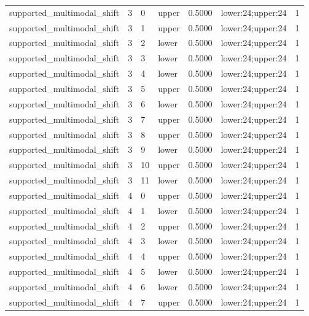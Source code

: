 \documentclass{article}
\begin{document}
\begin{table}[tbp]
{\begin{tabular}{lllllll}
supported\_multimodal\_shift & 3 & 0 & upper & 0.5000 & lower:24;upper:24 & 1 \\
supported\_multimodal\_shift & 3 & 1 & upper & 0.5000 & lower:24;upper:24 & 1 \\
supported\_multimodal\_shift & 3 & 2 & lower & 0.5000 & lower:24;upper:24 & 1 \\
supported\_multimodal\_shift & 3 & 3 & lower & 0.5000 & lower:24;upper:24 & 1 \\
supported\_multimodal\_shift & 3 & 4 & lower & 0.5000 & lower:24;upper:24 & 1 \\
supported\_multimodal\_shift & 3 & 5 & upper & 0.5000 & lower:24;upper:24 & 1 \\
supported\_multimodal\_shift & 3 & 6 & lower & 0.5000 & lower:24;upper:24 & 1 \\
supported\_multimodal\_shift & 3 & 7 & upper & 0.5000 & lower:24;upper:24 & 1 \\
supported\_multimodal\_shift & 3 & 8 & upper & 0.5000 & lower:24;upper:24 & 1 \\
supported\_multimodal\_shift & 3 & 9 & lower & 0.5000 & lower:24;upper:24 & 1 \\
supported\_multimodal\_shift & 3 & 10 & upper & 0.5000 & lower:24;upper:24 & 1 \\
supported\_multimodal\_shift & 3 & 11 & lower & 0.5000 & lower:24;upper:24 & 1 \\
supported\_multimodal\_shift & 4 & 0 & upper & 0.5000 & lower:24;upper:24 & 1 \\
supported\_multimodal\_shift & 4 & 1 & lower & 0.5000 & lower:24;upper:24 & 1 \\
supported\_multimodal\_shift & 4 & 2 & upper & 0.5000 & lower:24;upper:24 & 1 \\
supported\_multimodal\_shift & 4 & 3 & lower & 0.5000 & lower:24;upper:24 & 1 \\
supported\_multimodal\_shift & 4 & 4 & upper & 0.5000 & lower:24;upper:24 & 1 \\
supported\_multimodal\_shift & 4 & 5 & lower & 0.5000 & lower:24;upper:24 & 1 \\
supported\_multimodal\_shift & 4 & 6 & lower & 0.5000 & lower:24;upper:24 & 1 \\
supported\_multimodal\_shift & 4 & 7 & upper & 0.5000 & lower:24;upper:24 & 1 \\
\bottomrule
\end{tabular}
}
\end{table}

\clearpage
\end{document}
